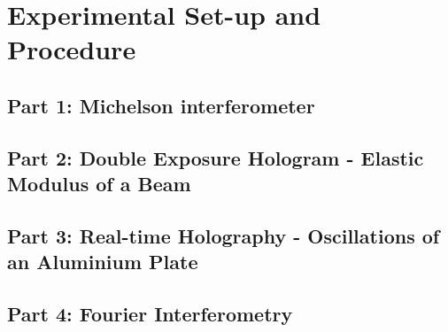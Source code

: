 \section{Experimental Set-up and Procedure}

\subsection{Part 1: Michelson interferometer}


\subsection{Part 2: Double Exposure Hologram - Elastic Modulus of a Beam \label{DEH}}


\subsection{Part 3: Real-time Holography - Oscillations of an Aluminium Plate \label{RTH}}

%
\subsection{Part 4: Fourier Interferometry \label{FI}}

